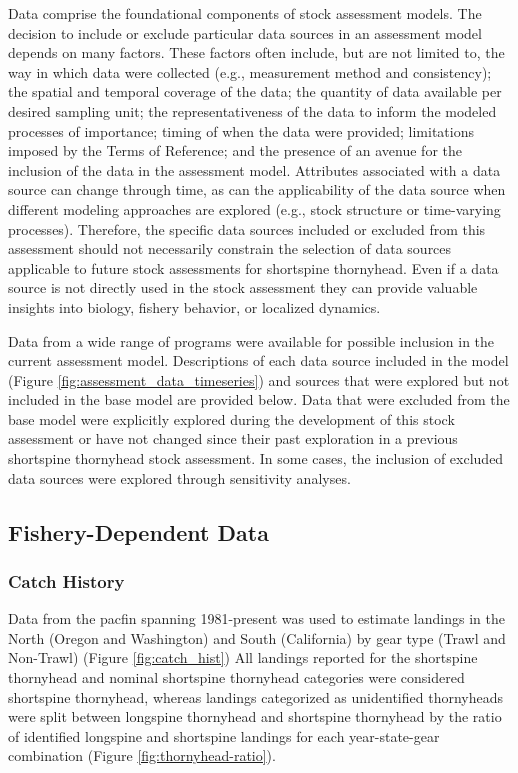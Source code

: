 \documentclass[11pt,
  english,
  letterpaper,
]{article}
\begin{document}
Data comprise the foundational components of stock assessment models. The decision to include or exclude particular data sources in an assessment model depends on many factors. These factors often include, but are not limited to, the way in which data were collected (e.g., measurement method and consistency); the spatial and temporal coverage of the data; the quantity of data available per desired sampling unit; the representativeness of the data to inform the modeled processes of importance; timing of when the data were provided; limitations imposed by the Terms of Reference; and the presence of an avenue for the inclusion of the data in the assessment model. Attributes associated with a data source can change through time, as can the applicability of the data source when different modeling approaches are explored (e.g., stock structure or time-varying processes). Therefore, the specific data sources included or excluded from this assessment should not necessarily constrain the selection of data sources applicable to future stock assessments for shortspine thornyhead. Even if a data source is not directly used in the stock assessment they can provide valuable insights into biology, fishery behavior, or localized dynamics.

Data from a wide range of programs were available for possible inclusion in the current assessment model. Descriptions of each data source included in the model (Figure \ref{fig:assessment_data_timeseries}) and sources that were explored but not included in the base model are provided below. Data that were excluded from the base model were explicitly explored during the development of this stock assessment or have not changed since their past exploration in a previous shortspine thornyhead stock assessment. In some cases, the inclusion of excluded data sources were explored through sensitivity analyses.

\hypertarget{fishery-dependent-data}{%
\subsection{Fishery-Dependent Data}\label{fishery-dependent-data}}

\hypertarget{catch-history}{%
\subsubsection{Catch History}\label{catch-history}}

Data from the \Gls{pacfin} spanning 1981-present was used to estimate landings in the North (Oregon and Washington) and South (California) by gear type (Trawl and Non-Trawl) (Figure \ref{fig:catch_hist}) All landings reported for the shortspine thornyhead and nominal shortspine thornyhead categories were considered shortspine thornyhead, whereas landings categorized as unidentified thornyheads were split between longspine thornyhead and shortspine thornyhead by the ratio of identified longspine and shortspine landings for each year-state-gear combination (Figure \ref{fig:thornyhead-ratio}).
\end{document}
